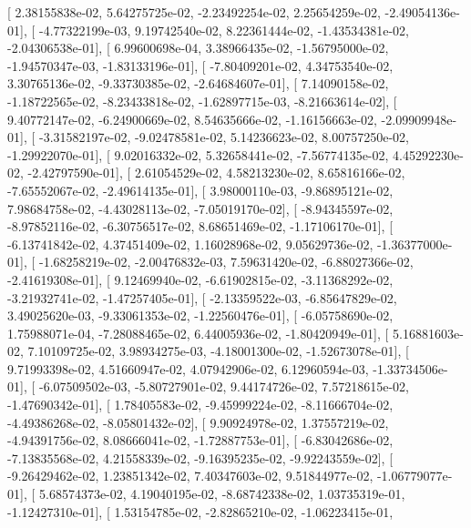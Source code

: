 \documentclass{article}
\begin{document}
       [  2.38155838e-02,   5.64275725e-02,  -2.23492254e-02,
          2.25654259e-02,  -2.49054136e-01],
       [ -4.77322199e-03,   9.19742540e-02,   8.22361444e-02,
         -1.43534381e-02,  -2.04306538e-01],
       [  6.99600698e-04,   3.38966435e-02,  -1.56795000e-02,
         -1.94570347e-03,  -1.83133196e-01],
       [ -7.80409201e-02,   4.34753540e-02,   3.30765136e-02,
         -9.33730385e-02,  -2.64684607e-01],
       [  7.14090158e-02,  -1.18722565e-02,  -8.23433818e-02,
         -1.62897715e-03,  -8.21663614e-02],
       [  9.40772147e-02,  -6.24900669e-02,   8.54635666e-02,
         -1.16156663e-02,  -2.09909948e-01],
       [ -3.31582197e-02,  -9.02478581e-02,   5.14236623e-02,
          8.00757250e-02,  -1.29922070e-01],
       [  9.02016332e-02,   5.32658441e-02,  -7.56774135e-02,
          4.45292230e-02,  -2.42797590e-01],
       [  2.61054529e-02,   4.58213230e-02,   8.65816166e-02,
         -7.65552067e-02,  -2.49614135e-01],
       [  3.98000110e-03,  -9.86895121e-02,   7.98684758e-02,
         -4.43028113e-02,  -7.05019170e-02],
       [ -8.94345597e-02,  -8.97852116e-02,  -6.30756517e-02,
          8.68651469e-02,  -1.17106170e-01],
       [ -6.13741842e-02,   4.37451409e-02,   1.16028968e-02,
          9.05629736e-02,  -1.36377000e-01],
       [ -1.68258219e-02,  -2.00476832e-03,   7.59631420e-02,
         -6.88027366e-02,  -2.41619308e-01],
       [  9.12469940e-02,  -6.61902815e-02,  -3.11368292e-02,
         -3.21932741e-02,  -1.47257405e-01],
       [ -2.13359522e-03,  -6.85647829e-02,   3.49025620e-03,
         -9.33061353e-02,  -1.22560476e-01],
       [ -6.05758690e-02,   1.75988071e-04,  -7.28088465e-02,
          6.44005936e-02,  -1.80420949e-01],
       [  5.16881603e-02,   7.10109725e-02,   3.98934275e-03,
         -4.18001300e-02,  -1.52673078e-01],
       [  9.71993398e-02,   4.51660947e-02,   4.07942906e-02,
          6.12960594e-03,  -1.33734506e-01],
       [ -6.07509502e-03,  -5.80727901e-02,   9.44174726e-02,
          7.57218615e-02,  -1.47690342e-01],
       [  1.78405583e-02,  -9.45999224e-02,  -8.11666704e-02,
         -4.49386268e-02,  -8.05801432e-02],
       [  9.90924978e-02,   1.37557219e-02,  -4.94391756e-02,
          8.08666041e-02,  -1.72887753e-01],
       [ -6.83042686e-02,  -7.13835568e-02,   4.21558339e-02,
         -9.16395235e-02,  -9.92243559e-02],
       [ -9.26429462e-02,   1.23851342e-02,   7.40347603e-02,
          9.51844977e-02,  -1.06779077e-01],
       [  5.68574373e-02,   4.19040195e-02,  -8.68742338e-02,
          1.03735319e-01,  -1.12427310e-01],
       [  1.53154785e-02,  -2.82865210e-02,  -1.06223415e-01,
\end{document}
